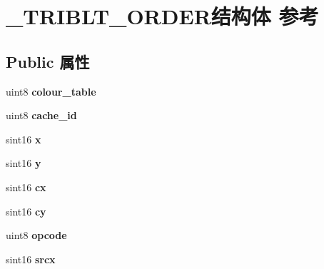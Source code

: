 \hypertarget{struct___t_r_i_b_l_t___o_r_d_e_r}{}\section{\+\_\+\+T\+R\+I\+B\+L\+T\+\_\+\+O\+R\+D\+E\+R结构体 参考}
\label{struct___t_r_i_b_l_t___o_r_d_e_r}
\subsection*{Public 属性}
\begin{DoxyCompactItemize}
\item 
\mbox{\label{struct___t_r_i_b_l_t___o_r_d_e_r_a5eda3416da7881d6c487d9720e25d4be}} 
uint8 {\bfseries colour\+\_\+table}
\item 
\mbox{\label{struct___t_r_i_b_l_t___o_r_d_e_r_abc19b3f6685eb58a849f4158e5b321e9}} 
uint8 {\bfseries cache\+\_\+id}
\item 
\mbox{\label{struct___t_r_i_b_l_t___o_r_d_e_r_ae57342e1b69d37ef99884b03868bce3f}} 
sint16 {\bfseries x}
\item 
\mbox{\label{struct___t_r_i_b_l_t___o_r_d_e_r_acba1d2401688855ee473f8af94ae8409}} 
sint16 {\bfseries y}
\item 
\mbox{\label{struct___t_r_i_b_l_t___o_r_d_e_r_a33cf2b4e5580037d7131cd7e31240ba3}} 
sint16 {\bfseries cx}
\item 
\mbox{\label{struct___t_r_i_b_l_t___o_r_d_e_r_a61d4d2ca07e2604f9f8268e081ea3a57}} 
sint16 {\bfseries cy}
\item 
\mbox{\label{struct___t_r_i_b_l_t___o_r_d_e_r_a3940eaad44543358f133c22d31fb6946}} 
uint8 {\bfseries opcode}
\item 
\mbox{\label{struct___t_r_i_b_l_t___o_r_d_e_r_a080a010c60a010c1772d8582707849fd}} 
sint16 {\bfseries srcx}
\item 
\mbox{\label{struct___t_r_i_b_l_t___o_r_d_e_r_a38d24f61ceceb0c702e1f6e2ded99caa}} 

\end{DoxyCompactItemize}
